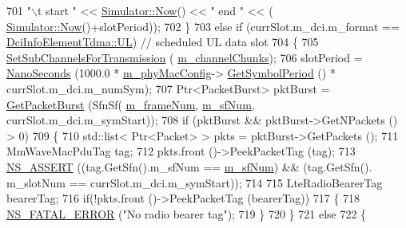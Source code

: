\begin{DoxyCode}
701                               \textcolor{stringliteral}{"\(\backslash\)t start "} << \hyperlink{classns3_1_1Simulator_ac3178fa975b419f7875e7105be122800}{Simulator::Now}() << \textcolor{stringliteral}{" end "} << (
      \hyperlink{classns3_1_1Simulator_ac3178fa975b419f7875e7105be122800}{Simulator::Now}()+slotPeriod));
702         \}
703         \textcolor{keywordflow}{else} \textcolor{keywordflow}{if} (currSlot.m\_dci.m\_format == \hyperlink{structns3_1_1DciInfoElementTdma_af998ccd3b1e03836c113d353facc76f4a8611bf12ef88d043baf0e591bc63b314}{DciInfoElementTdma::UL}) \textcolor{comment}{// scheduled UL
       data slot}
704         \{
705                 \hyperlink{classns3_1_1MmWaveUePhy_af282ce87d27141f5c0322caf44044a9f}{SetSubChannelsForTransmission} (
      \hyperlink{classns3_1_1MmWaveUePhy_aa41c90d5e37b7b4f65a4bad8b6e4295f}{m\_channelChunks});
706                 slotPeriod = \hyperlink{group__timecivil_ga281d64bcb4dad96267d83c7688ec433f}{NanoSeconds} (1000.0 * \hyperlink{classns3_1_1MmWavePhy_a869abf36bbdbb94eed77ba6e4846f6e4}{m\_phyMacConfig}->
      \hyperlink{classns3_1_1MmWavePhyMacCommon_a1048fa4a24a72abc5d4d982efd6c21af}{GetSymbolPeriod} () * currSlot.m\_dci.m\_numSym);
707                 Ptr<PacketBurst> pktBurst = \hyperlink{classns3_1_1MmWavePhy_acc47ea975529c5c4ae3ad138fb3f4278}{GetPacketBurst} (SfnSf(
      \hyperlink{classns3_1_1MmWavePhy_a852ce585035a1c12122d2775e64ff38a}{m\_frameNum}, \hyperlink{classns3_1_1MmWavePhy_af3d76eb9f3e5e1ff669852d05986c1a3}{m\_sfNum}, currSlot.m\_dci.m\_symStart));
708                 \textcolor{keywordflow}{if} (pktBurst && pktBurst->GetNPackets () > 0)
709                 \{
710                         std::list< Ptr<Packet> > pkts = pktBurst->GetPackets ();
711                         MmWaveMacPduTag tag;
712                         pkts.front ()->PeekPacketTag (tag);
713                         \hyperlink{assert_8h_a6dccdb0de9b252f60088ce281c49d052}{NS\_ASSERT} ((tag.GetSfn().m\_sfNum == \hyperlink{classns3_1_1MmWavePhy_af3d76eb9f3e5e1ff669852d05986c1a3}{m\_sfNum}) && (tag.GetSfn().
      m\_slotNum == currSlot.m\_dci.m\_symStart));
714 
715                         LteRadioBearerTag bearerTag;
716                         \textcolor{keywordflow}{if}(!pkts.front ()->PeekPacketTag (bearerTag))
717                         \{
718                                 \hyperlink{group__fatal_ga5131d5e3f75d7d4cbfd706ac456fdc85}{NS\_FATAL\_ERROR} (\textcolor{stringliteral}{"No radio bearer tag"});
719                         \}
720                 \}
721                 \textcolor{keywordflow}{else}
722                 \{

\end{DoxyCode}

